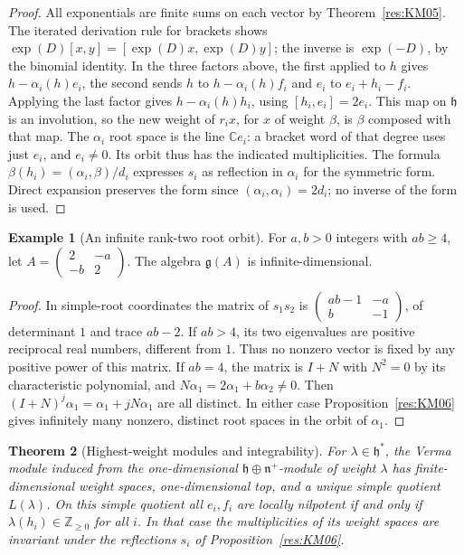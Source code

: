 \documentclass[11pt,oneside,openany]{book}
\newtheorem{theorem}{Theorem}[chapter]
\theoremstyle{definition}
\newtheorem{example}[theorem]{Example}
\theoremstyle{remark}
\begin{document}
\begin{proof}
All exponentials are finite sums on each vector by
Theorem~\ref{res:KM05}. The iterated derivation rule for brackets
shows \(\exp(D)[x,y]=[\exp(D)x,\exp(D)y]\); the inverse is
\(\exp(-D)\), by the binomial identity. In the three factors above,
the first applied to \(h\) gives \(h-\alpha_i(h)e_i\),
the second sends \(h\) to \(h-\alpha_i(h)f_i\) and \(e_i\) to
\(e_i+h_i-f_i\). Applying the last factor gives \(h-\alpha_i(h)h_i\),
using \([h_i,e_i]=2e_i\). This map on \(\mathfrak h\) is an
involution, so the new weight of \(r_i x\), for \(x\) of
weight \(\beta\), is \(\beta\) composed with that map. The
\(\alpha_i\) root space is the line \(\mathbb C e_i\): a bracket
word of that degree uses just \(e_i\), and \(e_i\ne0\).
Its orbit thus has the indicated multiplicities. The formula
\(\beta(h_i)= (\alpha_i,\beta)/d_i\) expresses \(s_i\) as
reflection in \(\alpha_i\) for the symmetric form. Direct
expansion preserves the form since
\((\alpha_i,\alpha_i)=2d_i\); no inverse of the form is used.
\end{proof}

\begin{example}[An infinite rank-two root orbit]
\label{res:KM07}
For \(a,b>0\) integers with \(ab\ge4\), let
\(A=\left(\begin{smallmatrix}2&-a\\-b&2\end{smallmatrix}\right)\).
The algebra \(\mathfrak g(A)\) is infinite-dimensional.
\end{example}

\begin{proof}
In simple-root coordinates the matrix of \(s_1s_2\) is
\(\left(\begin{smallmatrix}ab-1&-a\\ b&-1\end{smallmatrix}\right)\),
of determinant \(1\) and trace \(ab-2\). If \(ab>4\), its
two eigenvalues are positive reciprocal real numbers, different
from \(1\). Thus no nonzero vector is fixed by any positive
power of this matrix. If \(ab=4\), the matrix is \(I+N\) with
\(N^2=0\) by its characteristic polynomial, and
\(N\alpha_1=2\alpha_1+b\alpha_2\ne0\).
Then \((I+N)^j\alpha_1=\alpha_1+jN\alpha_1\) are all distinct.
In either case Proposition~\ref{res:KM06} gives infinitely many
nonzero, distinct root spaces in the orbit of \(\alpha_1\).
\end{proof}

\begin{theorem}[Highest-weight modules and integrability]
\label{res:KM08}
For \(\lambda\in\mathfrak h^*\), the Verma module induced from the
one-dimensional \(\mathfrak h\oplus\mathfrak n^+\)-module of
weight \(\lambda\) has finite-dimensional weight spaces,
one-dimensional top, and a unique simple quotient \(L(\lambda)\).
On this simple quotient all \(e_i,f_i\) are locally nilpotent
if and only if \(\lambda(h_i)\in\mathbb Z_{\ge0}\) for all \(i\).
In that case the multiplicities of its weight spaces are invariant
under the reflections \(s_i\) of Proposition~\ref{res:KM06}.
\end{theorem}
\end{document}
